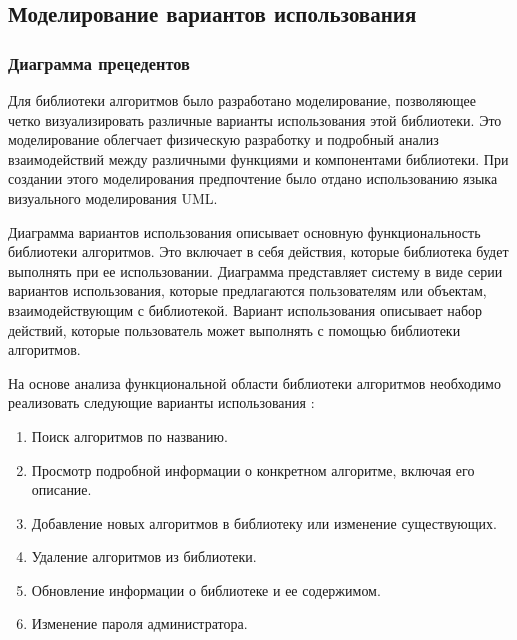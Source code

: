 \begin{enumerate}
	
	\subsection{Моделирование вариантов использования}
	\subsubsection{Диаграмма прецедентов}
	Для библиотеки алгоритмов было разработано моделирование, позволяющее четко визуализировать различные варианты использования этой библиотеки. Это моделирование облегчает физическую разработку и подробный анализ взаимодействий между различными функциями и компонентами библиотеки. При создании этого моделирования предпочтение было отдано использованию языка визуального моделирования UML.
	
	Диаграмма вариантов использования описывает основную функциональность библиотеки алгоритмов. Это включает в себя действия, которые библиотека будет выполнять при ее использовании. Диаграмма представляет систему в виде серии вариантов использования, которые предлагаются пользователям или объектам, взаимодействующим с библиотекой. Вариант использования описывает набор действий, которые пользователь может выполнять с помощью библиотеки алгоритмов.
	
	На основе анализа функциональной области библиотеки алгоритмов необходимо реализовать следующие варианты использования :
	
	\begin{enumerate}
	\item  Поиск алгоритмов по названию.
	\item Просмотр подробной информации о конкретном алгоритме, включая его описание.
	\item Добавление новых алгоритмов в библиотеку или изменение существующих.
	\item Удаление алгоритмов из библиотеки.
	\item Обновление информации о библиотеке и ее содержимом.
	\item Изменение пароля администратора.
	\end{enumerate}
	

\end{enumerate}
